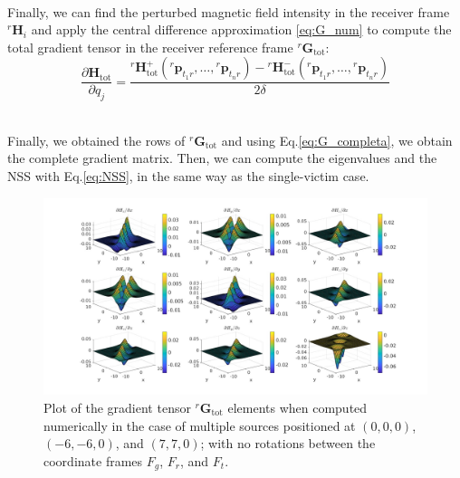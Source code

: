 \documentclass[main]{subfiles}
\begin{document}
\noindent\\
Finally, we can find the perturbed magnetic field intensity in the receiver frame
${}^r \mathbf{H}_i$ and apply the central difference approximation 
\eqref{eq:G_num} to compute the total gradient tensor in the receiver reference frame 
${}^r \mathbf{G}_{\text{tot}}$:
\begin{equation}
    \frac{\partial \mathbf{H}_{\text{tot}}}{\partial q_j} = 
    \frac{
     {}^r \mathbf{H}_{\text{tot}}^+ ({}^r \mathbf{p}_{t_1r}, \dots , {}^r \mathbf{p}_{t_nr})
    -  {}^r \mathbf{H}_{\text{tot}}^- ({}^r \mathbf{p}_{t_1r}, \dots , {}^r \mathbf{p}_{t_nr})}
    {2 \delta}
\end{equation}

\noindent\\
Finally, we obtained the rows of ${}^r \mathbf{G}_{\text{tot}}$ and using Eq.\ref{eq:G_completa}, 
we obtain the complete gradient matrix. Then, we can compute the eigenvalues and the NSS
with Eq.\ref{eq:NSS}, in the same way as the single-victim case.

\begin{figure}
\hspace*{-0.2\textwidth}
\includegraphics[width=1.4\textwidth]{images/gradients_multi_num.jpg}
\caption{Plot of the gradient tensor ${}^r \mathbf{G}_{\text{tot}}$ elements
when computed numerically in the case of multiple sources positioned at  $(0,0,0)$, $(-6,-6,0)$, and $(7,7,0)$; with no rotations 
between the coordinate frames \( F_g \), \( F_r \), and \( F_t \).}
\label{fig:gradients_multi_num}
\end{figure}
\end{document}
